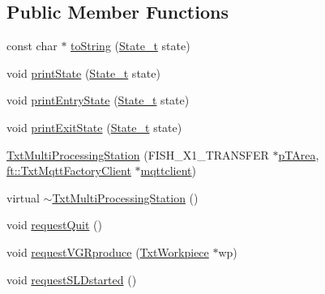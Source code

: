 \subsection*{Public Member Functions}
\begin{DoxyCompactItemize}
\item 
const char $\ast$ \hyperlink{classft_1_1_txt_multi_processing_station_a011660aedfc9db87528ea225dd1992d7}{to\+String} (\hyperlink{classft_1_1_txt_multi_processing_station_a345fc850c7a3fd9062de2286a716fd2e}{State\+\_\+t} state)
\item 
void \hyperlink{classft_1_1_txt_multi_processing_station_ac285715dcca171dc11881091b65d74ec}{print\+State} (\hyperlink{classft_1_1_txt_multi_processing_station_a345fc850c7a3fd9062de2286a716fd2e}{State\+\_\+t} state)
\item 
void \hyperlink{classft_1_1_txt_multi_processing_station_a2f4b727b06ad7ac5da1bec91944f9521}{print\+Entry\+State} (\hyperlink{classft_1_1_txt_multi_processing_station_a345fc850c7a3fd9062de2286a716fd2e}{State\+\_\+t} state)
\item 
void \hyperlink{classft_1_1_txt_multi_processing_station_acce7d500cc6c6c606e477a958a4b6fbe}{print\+Exit\+State} (\hyperlink{classft_1_1_txt_multi_processing_station_a345fc850c7a3fd9062de2286a716fd2e}{State\+\_\+t} state)
\item 
\hyperlink{classft_1_1_txt_multi_processing_station_aa24e16e04386fbc501a9db25d87c42e1}{Txt\+Multi\+Processing\+Station} (F\+I\+S\+H\+\_\+\+X1\+\_\+\+T\+R\+A\+N\+S\+F\+ER $\ast$\hyperlink{classft_1_1_txt_simulation_model_a9facd66a0dbecd676ae7b72c37a0b300}{p\+T\+Area}, \hyperlink{classft_1_1_txt_mqtt_factory_client}{ft\+::\+Txt\+Mqtt\+Factory\+Client} $\ast$\hyperlink{classft_1_1_txt_simulation_model_a6a92fdef8619b9b1636c7c464091ea3a}{mqttclient})
\item 
virtual \hyperlink{classft_1_1_txt_multi_processing_station_aa06cb8eca1b89da59412803dd90bc1b1}{$\sim$\+Txt\+Multi\+Processing\+Station} ()
\item 
void \hyperlink{classft_1_1_txt_multi_processing_station_a8f481b0f89f0968c2483a9eeae1fcb0b}{request\+Quit} ()
\item 
void \hyperlink{classft_1_1_txt_multi_processing_station_aba10b3958b9486516addc72da48412a5}{request\+V\+G\+Rproduce} (\hyperlink{classft_1_1_txt_workpiece}{Txt\+Workpiece} $\ast$wp)
\item 
void \hyperlink{classft_1_1_txt_multi_processing_station_aedf25609c07d4f50132567fdcddfd33d}{request\+S\+L\+Dstarted} ()
\item 

\end{DoxyCompactItemize}
